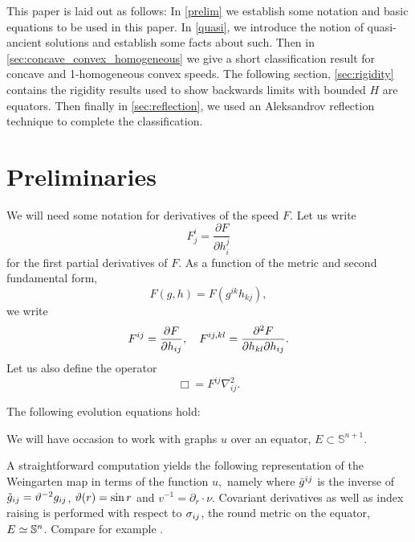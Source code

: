 \documentclass{amsart}
\begin{document}
This paper is laid out as follows: In \cref{prelim} we establish some notation and basic equations to be used in this paper. In \cref{quasi}, we introduce the notion of quasi-ancient solutions and establish some facts about such. Then in \cref{sec:concave_convex_homogeneous} we give a short classification result for concave and 1-homogeneous convex speeds. The following section, \cref{sec:rigidity} contains the rigidity results used to show backwards limits with bounded \(H\) are equators. Then finally in \cref{sec:reflection}, we used an Aleksandrov reflection technique to complete the classification.

\section{Preliminaries}
\label{sec:prelim}

We will need some notation for derivatives of the speed \(F\). Let us write
\[
F^{i}_{j} = \frac{\partial F}{\partial h^{j}_{i}}
\]
for the first partial derivatives of \(F\). As a function of the metric and second fundamental form,
\[
F(g, h) = F(g^{ik} h_{kj}),
\]
we write
\[
F^{ij} = \frac{\partial F}{\partial h_{ij}}, \quad F^{ij,kl} = \fr{\partial^2F}{\partial h_{kl} \partial h_{ij}}.
\]
Let us also define the operator
\[
\Box = F^{ij} \nabla^2_{ij}.
\]
\begin{lemma} \label{lem: basi ev}
The following evolution equations hold:
\end{lemma}

We will have occasion to work with graphs \(u\) over an equator, \(E \subset \mathbb{S}^{n+1}\).

A straightforward computation yields the following representation of the Weingarten map in terms of the function $u,$ namely
where $\~g^{ij}$ is the inverse of $\~g_{ij}=\vt^{-2}g_{ij}$, $\vt(r)=\sin r$ and \(v^{-1} = \partial_r \cdot \nu\). Covariant derivatives as well as index raising is performed with respect to $\s_{ij}$, the round metric on the equator, \(E \simeq \S^n\). Compare for example \cite[(3.82)]{Scheuer:05/2015}.
\end{document}
